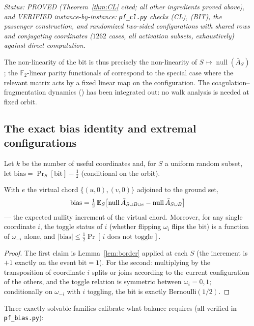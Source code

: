 \emph{Status: PROVED (Theorem~\ref{thm:CL} cited; all other
ingredients proved above), and VERIFIED instance-by-instance:
\texttt{pf\_cl.py} checks (CL), (BIT), the passenger construction,
and randomized two-sided configurations with shared rows and
conjugating coordinates ($1262$ cases, all activation subsets,
exhaustively) against direct computation.}

The non-linearity of the bit is thus precisely the non-linearity of
$S\mapsto\operatorname{null}(\bar A_S)$; the $\mathbb{F}_2$-linear
parity functionals of \cite{KPS25} correspond to the special case
where the relevant matrix acts by a fixed linear map on the
configuration.  The coagulation--fragmentation dynamics
(\cite{Sch05}) has been integrated out: no walk analysis is needed at
fixed orbit.

\subsection{The exact bias identity and extremal configurations}

Let $k$ be the number of useful coordinates and, for $S$ a uniform
random subset, let
$\mathrm{bias}=\Pr_S[\mathrm{bit}]-\tfrac12$ (conditional on the
orbit).

\begin{proposition}\label{prop:bias}
With $e$ the virtual chord $\{(u,0),(v,0)\}$ adjoined to the ground
set,
\[
\mathrm{bias}
=\tfrac12\,\mathbb{E}_S\bigl[\operatorname{null}\bar A_{S\cup B\cup e}
-\operatorname{null}\bar A_{S\cup B}\bigr]
\]
--- the expected nullity increment of the virtual chord.  Moreover,
for any single coordinate $i$, the toggle status of $i$ (whether
flipping $\omega_i$ flips the bit) is a function of
$\omega_{-i}$ alone, and
$|\mathrm{bias}|\le\tfrac12\Pr[\,i\text{ does not toggle}\,]$.
\end{proposition}

\begin{proof}
The first claim is Lemma~\ref{lem:border} applied at each $S$ (the
increment is $+1$ exactly on the event $\mathrm{bit}=1$).  For the
second: multiplying by the transposition of coordinate $i$ splits or
joins according to the current configuration of the others, and the
toggle relation is symmetric between $\omega_i=0,1$; conditionally on
$\omega_{-i}$ with $i$ toggling, the bit is exactly Bernoulli$(1/2)$.
\end{proof}

Three exactly solvable families calibrate what balance requires
(all verified in \texttt{pf\_bias.py}):

